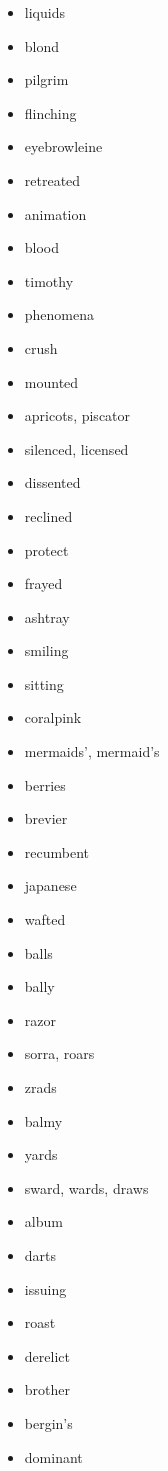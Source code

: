 \documentclass{article}
\begin{document}
\begin{itemize}
    \item liquids
    \item blond
    \item pilgrim
    \item flinching
    \item eyebrowleine
    \item retreated
    \item animation
    \item blood
    \item timothy
    \item phenomena
    \item crush
    \item mounted
    \item apricots, piscator
    \item silenced, licensed
    \item dissented
    \item reclined
    \item protect
    \item frayed
    \item ashtray
    \item smiling
    \item sitting
    \item coralpink
    \item mermaids', mermaid's
    \item berries
    \item brevier
    \item recumbent
    \item japanese
    \item wafted
    \item balls
    \item bally
    \item razor
    \item sorra, roars
    \item zrads
    \item balmy
    \item yards
    \item sward, wards, draws
    \item album
    \item darts
    \item issuing
    \item roast
    \item derelict
    \item brother
    \item bergin's
    \item dominant

\end{itemize}
\end{document}
